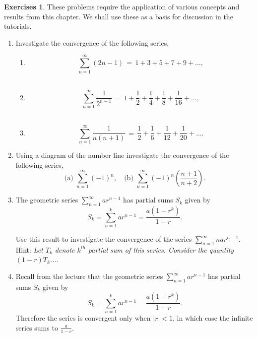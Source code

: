 \documentclass[extrafontsizes, twoside, a4paper]{memoir}
\theoremstyle{plain}%
\theoremstyle{definition}
\newtheorem{exer}{Exercises}[chapter]
\theoremstyle{remark}
\newcommand{\postitemskip}{\vskip 0.2in}
\begin{document}
\begin{exer}
These problems require the application of various concepts and results from this chapter. We shall use these as a basis for discussion in the tutorials.
\begin{enumerate}
\item
 Investigate the convergence of the following series,
\begin{enumerate}
\item
$$\sum_{n=1}^\infty (2n - 1) \, = \, 1 + 3 + 5 + 7 + 9 + \dots  ,$$\\
\item
$$\sum_{n=1}^\infty \dfrac{1}{2^{n-1}} \, = \, 1 + \dfrac{1}{2} +
\dfrac{1}{4} + \dfrac{1}{8} + \dfrac{1}{16} + \dots ,$$\\
\item
$$\sum_{n=1}^\infty \dfrac{1}{n(n+1)} \, = \, \dfrac{1}{2} +
\dfrac{1}{6} + \dfrac{1}{12} + \frac{1}{20} + \dots.$$
\end{enumerate}
\postitemskip
\item
 Using a diagram of the number line investigate the convergence of
the following series,
$$\text{(a)  } \sum_{n=1}^\infty (-1)^n, \quad \text{(b)  }
\sum_{n=1}^\infty (-1)^n \left ( \dfrac{n+1}{n+2} \right ) .$$
\postitemskip
\item
 The geometric series $\sum_{n=1}^\infty ar^{n-1}$ has partial sums $S_k$ given by
$$S_k=\sum_{n=1}^k ar^{n-1} =  \dfrac{a(1-r^k)}{1-r}.$$

Use this result to investigate the convergence of the series
$\sum_{n=1}^\infty n a r^{n-1}$. Hint: \textit{Let $T_k$ denote
$k^{th}$ partial sum of this series. Consider the quantity
$(1-r)T_k$....}
\postitemskip
\item
 Recall from the lecture that the geometric series $\sum_{n=1}^\infty ar^{n-1}$ has partial sums $S_k$ given by
$$S_k=\sum_{n=1}^k ar^{n-1} =  \dfrac{a(1-r^k)}{1-r}.$$ Therefore the series is convergent only when $|r|<1$, in which case the infinite series sums to $\tfrac{a}{1-r}$.


\end{enumerate}
\end{exer}
\end{document}
